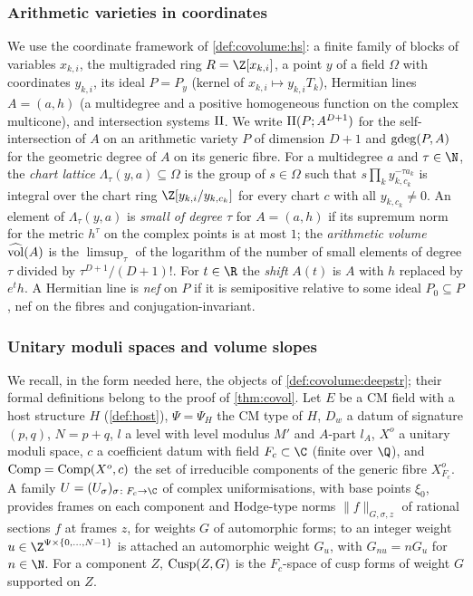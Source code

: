 \subsubsection*{Arithmetic varieties in coordinates}
We use the coordinate framework of \cref{def:covolume:hs}: a finite family of blocks of variables
$x_{k,i}$, the multigraded ring $R=\Z[x_{k,i}]$, a point $y$ of a field $\Omega$ with coordinates $y_{k,i}$,
its ideal $P=P_y$ (kernel of $x_{k,i}\mapsto y_{k,i}T_k$), Hermitian lines $A=(a,h)$ (a multidegree and a
positive homogeneous function on the complex multicone), and intersection systems $\mathrm{II}$. We write
$\mathrm{II}(P;A^{D+1})$ for the self-intersection of $A$ on an arithmetic variety $P$ of dimension $D+1$
and $\operatorname{gdeg}(P,A)$ for the geometric degree of $A$ on its generic fibre. For a multidegree $a$ and
$\tau\in\N$, the \emph{chart lattice} $\Lambda_\tau(y,a)\subseteq\Omega$ is the group of $s\in\Omega$ such that
$s\prod_ky_{k,c_k}^{-\tau a_k}$ is integral over the chart ring $\Z[y_{k,i}/y_{k,c_k}]$ for every chart
$c$ with all $y_{k,c_k}\ne0$. An element of $\Lambda_\tau(y,a)$ is \emph{small of degree $\tau$} for $A=(a,h)$ if
its supremum norm for the metric $h^\tau$ on the complex points is at most $1$; the \emph{arithmetic volume}
$\widehat{\operatorname{vol}}(A)$ is the $\limsup_\tau$ of the logarithm of the number of small elements of degree $\tau$
divided by $\tau^{D+1}/(D+1)!$. For $t\in\R$ the \emph{shift} $A(t)$ is $A$ with $h$ replaced by $e^th$.
A Hermitian line is \emph{nef} on $P$ if it is semipositive relative to some ideal $P_0\subseteq P$, nef on
the fibres and conjugation-invariant.

\subsubsection*{Unitary moduli spaces and volume slopes}
We recall, in the form needed here, the objects of \cref{def:covolume:deepstr}; their formal definitions
belong to the proof of \cref{thm:covol}. Let $E$ be a CM field with a host structure $H$
(\cref{def:host}), $\Psi=\Psi_H$ the CM type of $H$, $D_w$ a datum of signature $(p,q)$, $N=p+q$, $l$ a
level with level modulus $M'$ and $A$-part $l_A$, $X^o$ a unitary moduli space, $c$ a coefficient datum
with field $F_c\subset\C$ (finite over $\Q$), and $\operatorname{Comp}=\operatorname{Comp}(X^o,c)$ the set of irreducible
components of the generic fibre $X^o_{F_c}$. A family $U=(U_\sigma)_{\sigma\colon F_c\to\C}$ of complex
uniformisations, with base points $\xi_0$, provides frames on each component and Hodge-type norms
$\|f\|_{G,\sigma,z}$ of rational sections $f$ at frames $z$, for weights $G$ of automorphic forms; to an
integer weight $u\in\Z^{\Psi\times\{0,\dots,N-1\}}$ is attached an automorphic weight $G_u$, with
$G_{nu}=nG_u$ for $n\in\N$. For a component $Z$, $\operatorname{Cusp}(Z,G)$ is the $F_c$-space of cusp forms of weight
$G$ supported on $Z$.

